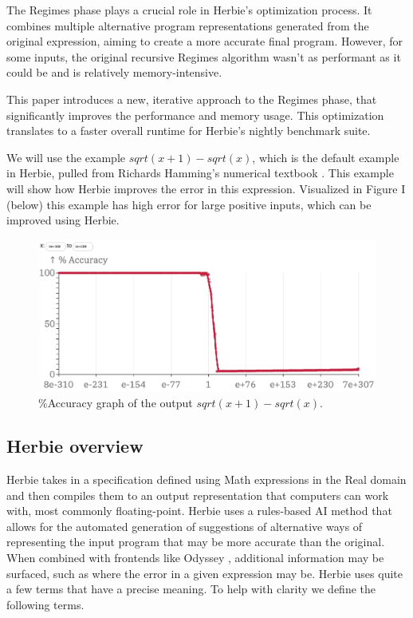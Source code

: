 \documentclass{article}
\begin{document}
The Regimes phase plays a crucial role in Herbie's optimization process. It combines multiple alternative program representations generated from the original expression, aiming to create a more accurate final program. However, for some inputs, the original recursive Regimes algorithm wasn’t as performant as it could be and is relatively memory-intensive.

This paper introduces a new, iterative approach to the Regimes phase, that significantly improves the performance and memory usage. This optimization translates to a faster overall runtime for Herbie's nightly benchmark suite.

We will use the example $sqrt(x + 1) - sqrt(x)$, which is the default example in Herbie, pulled from Richards Hamming’s numerical textbook \cite{Hamming}. This example will show how Herbie improves the error in this expression. Visualized in Figure I (below) this example has high error for large positive inputs, which can be improved using Herbie.

\begin{figure}[ht]
\centering
\begin{minipage}{0.6\textwidth}
  \includegraphics[width=\textwidth]{accuracy-graph.png}
\end{minipage}
\caption{\%Accuracy graph of the output $sqrt(x + 1) - sqrt(x)$.}
\label{fig:hypot-error-graph}
\end{figure}

\subsection{Herbie overview}

Herbie takes in a specification defined using Math expressions in the Real domain and then compiles them to an output representation that computers can work with, most commonly floating-point. Herbie uses a rules-based AI method that allows for the automated generation of suggestions of alternative ways of representing the input program that may be more accurate than the original. When combined with frontends like Odyssey \cite{Odyssey}, additional information may be surfaced, such as where the error in a given expression may be. Herbie uses quite a few terms that have a precise meaning. To help with clarity we define the following terms.
\end{document}
